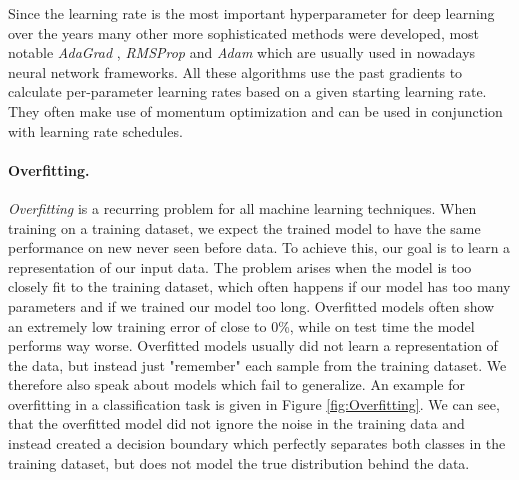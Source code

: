 Since the learning rate is the most important hyperparameter for deep learning over the years many other more sophisticated methods were developed, most notable \textit{AdaGrad} \cite{duchi2011adaptive}, \textit{RMSProp} \cite{tieleman2012lecture} and \textit{Adam} \cite{kingma2014adam} which are usually used in nowadays neural network frameworks. All these algorithms use the past gradients to calculate per-parameter learning rates based on a given starting learning rate. They often make use of momentum optimization and can be used in conjunction with learning rate schedules.


\paragraph{Overfitting.}
\textit{Overfitting} is a recurring problem for all machine learning techniques. When training on a training dataset, we expect the trained model to have the same performance on new never seen before data. To achieve this, our goal is to learn a representation of our input data. The problem arises when the model is too closely fit to the training dataset, which often happens if our model has too many parameters and if we trained our model too long. Overfitted models often show an extremely low training error of close to 0\%, while on test time  the model performs way worse. Overfitted models usually did not learn a representation of the data, but instead just "remember" each sample from the training dataset. We therefore also speak about models which fail to generalize. An example for overfitting in a classification task is given in Figure \ref{fig:Overfitting}. We can see, that the overfitted model did not ignore the noise in the training data and instead created a decision boundary which perfectly separates both classes in the training dataset, but does not model the true distribution behind the data.


